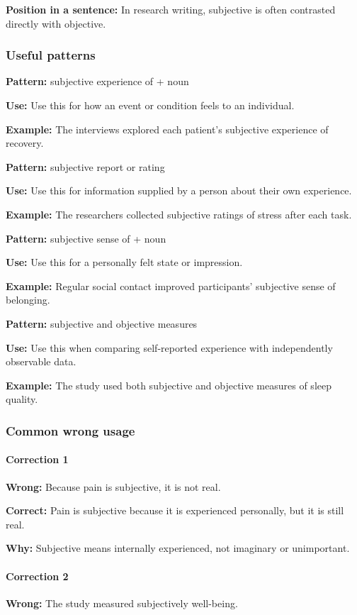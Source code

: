 \documentclass[11pt]{article}
\begin{document}
\textbf{Position in a sentence:} In research writing, subjective is often contrasted directly with objective.

\subsubsection{Useful patterns}
\textbf{Pattern:} subjective experience of + noun

\textbf{Use:} Use this for how an event or condition feels to an individual.

\textbf{Example:} The interviews explored each patient's subjective experience of recovery.

\textbf{Pattern:} subjective report or rating

\textbf{Use:} Use this for information supplied by a person about their own experience.

\textbf{Example:} The researchers collected subjective ratings of stress after each task.

\textbf{Pattern:} subjective sense of + noun

\textbf{Use:} Use this for a personally felt state or impression.

\textbf{Example:} Regular social contact improved participants' subjective sense of belonging.

\textbf{Pattern:} subjective and objective measures

\textbf{Use:} Use this when comparing self-reported experience with independently observable data.

\textbf{Example:} The study used both subjective and objective measures of sleep quality.

\subsubsection{Common wrong usage}
\paragraph{Correction 1}
\textbf{Wrong:} Because pain is subjective, it is not real.

\textbf{Correct:} Pain is subjective because it is experienced personally, but it is still real.

\textbf{Why:} Subjective means internally experienced, not imaginary or unimportant.

\paragraph{Correction 2}
\textbf{Wrong:} The study measured subjectively well-being.
\end{document}
